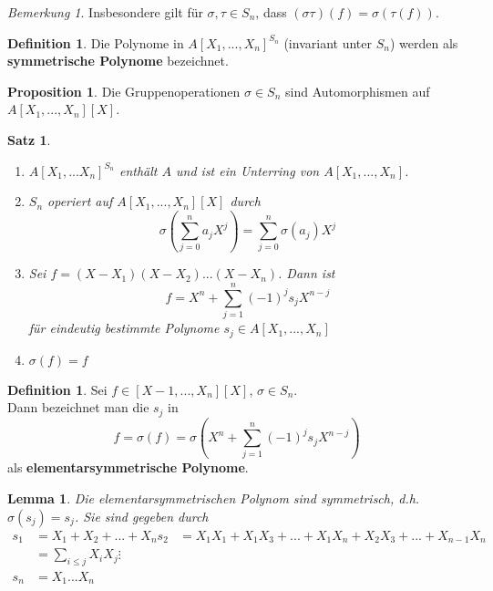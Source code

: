 \documentclass[10pt,a4paper]{article}
\theoremstyle{plain}
\newtheorem{lem}[theorem]{Lemma}
\newtheorem{satz}[theorem]{Satz}
\theoremstyle{definition}
\newtheorem{definition}[theorem]{Definition}
\newtheorem{prop}[theorem]{Proposition}
\theoremstyle{remark}
\newtheorem{bem}[theorem]{Bemerkung}
\begin{document}
	\begin{bem}
		Insbesondere gilt für $\sigma,\tau\in S_n$, dass $(\sigma\tau)(f)=\sigma(\tau(f))$.
	\end{bem}


	\begin{definition}
		Die Polynome in $A[X_1,...,X_n]^{S_n}$ (invariant unter $S_n$) werden als \textbf{symmetrische Polynome} bezeichnet.
	\end{definition}
	
	\begin{prop}
		Die Gruppenoperationen $\sigma\in S_n$ sind Automorphismen auf $A[X_1,...,X_n][X]$.
	\end{prop}
	
	\begin{satz}
		\begin{enumerate}
			\item $A[X_1,...X_n]^{S_n}$ enthält $A$ und ist ein Unterring von $A[X_1,...,X_n]$.\\
			\item $S_n$ operiert auf $A[X_1,...,X_n][X]$ durch
			\[\sigma\left(\sum_{j=0}^n a_jX^j\right)=\sum_{j=0}^{n}\sigma(a_j)X^j\]
			\item Sei $f=(X-X_1)(X-X_2)...(X-X_n)$. Dann ist
			\[f=X^n+\sum_{j=1}^{n}(-1)^js_jX^{n-j}\]
			für eindeutig bestimmte Polynome $s_j\in A[X_1,...,X_n]$
			\item $\sigma(f)=f$

		\end{enumerate}
	\end{satz}

	\begin{definition}
		Sei $f\in[X-1,...,X_n][X]$, $\sigma\in S_n$.\\
		Dann bezeichnet man die $s_j$ in
		\[f=\sigma(f)=\sigma\left(X^n+\sum_{j=1}^{n}(-1)^js_jX^{n-j}\right)\]
		als \textbf{elementarsymmetrische Polynome}.
	\end{definition}

	\begin{lem}
		Die elementarsymmetrischen Polynom sind symmetrisch, d.h. $\sigma(s_j)=s_j$. Sie sind gegeben durch
		\begin{align*}
		s_1&=X_1+X_2+...+X_n
		s_2&=X_1X_1+X_1X_3+...+X_1X_n+X_2X_3+...+X_{n-1}X_n\\
		&=\sum_{i\leq j} X_iX_j
		\vdots&\\
		s_n&=X_1...X_n
		\end{align*}
	\end{lem}
\end{document}
